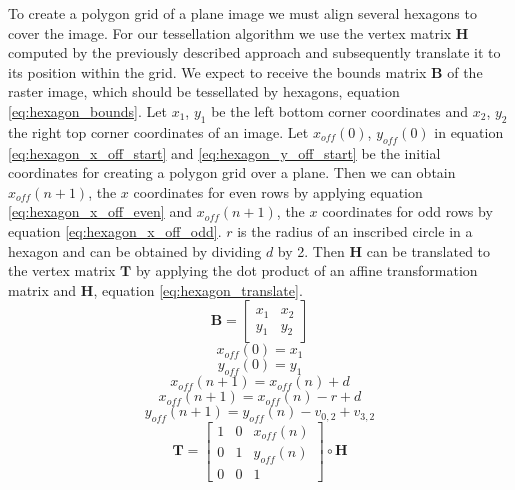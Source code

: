 		To create a polygon grid of a plane image we must align several hexagons to cover the image. For our tessellation algorithm we use the vertex matrix $\mathbf{H}$ computed by the previously described approach and subsequently translate it to its position within the grid. We expect to receive the bounds matrix $\mathbf{B}$ of the raster image, which should be tessellated by hexagons, equation \ref{eq:hexagon_bounds}. Let $x_1$, $y_1$ be the left bottom corner coordinates and $x_2$, $y_2$ the right top corner coordinates of an image. Let $x_{off}(0)$, $y_{off}(0)$ in equation \ref{eq:hexagon_x_off_start} and \ref{eq:hexagon_y_off_start} be the initial coordinates for creating a polygon grid over a plane. Then we can obtain $x_{off}(n+1)$, the $x$ coordinates for even rows by applying equation \ref{eq:hexagon_x_off_even} and $x_{off}(n+1)$, the $x$ coordinates for odd rows by equation \ref{eq:hexagon_x_off_odd}. $r$ is the radius of an inscribed circle in a hexagon and can be obtained by dividing $d$ by 2. Then $\mathbf{H}$ can be translated to the vertex matrix $\mathbf{T}$ by applying the dot product of an affine transformation matrix and $\mathbf{H}$, equation \ref{eq:hexagon_translate}.
		\begin{equation}
		\label{eq:hexagon_bounds}
			\mathbf{B} =
				\begin{bmatrix}
				x_1 & x_2 \\
				y_1 & y_2
			\end{bmatrix}
		\end{equation}
		\begin{equation}
		\label{eq:hexagon_x_off_start}
			x_{off}(0)=x_1
		\end{equation}
		\begin{equation}
		\label{eq:hexagon_y_off_start}
			y_{off}(0)=y_1
		\end{equation}
		\begin{equation}
		\label{eq:hexagon_x_off_even}
			x_{off}(n+1)=x_{off}(n)+d
		\end{equation}
		\begin{equation}
		\label{eq:hexagon_x_off_odd}
			x_{off}(n+1)=x_{off}(n)-r+d
		\end{equation}
		\begin{equation}
		\label{eq:hexagon_y_off}
			y_{off}(n+1)=y_{off}(n)-v_{0,2}+v_{3,2}
		\end{equation}
		\begin{equation}
		\label{eq:hexagon_translate}
		\mathbf{T} =
			\begin{bmatrix}
				1 & 0 & x_{off}(n) \\
				0 & 1 & y_{off}(n) \\
				0 & 0 & 1
			\end{bmatrix} \circ \mathbf{H}
		\end{equation}

